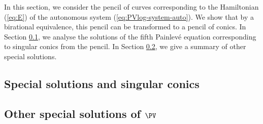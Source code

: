 In this section, we consider the pencil of curves corresponding to the Hamiltonian (\ref{eq:E}) of the autonomous system (\ref{eq:PVlog-system-auto}).
We show that by a birational equivalence, this pencil can be transformed to a pencil of conics.
In Section \ref{sec:conics}, we analyse the solutions of the fifth Painlev\'e equation corresponding to singular conics from the pencil.
In Section \ref{sec:other}, we give a summary of other special solutions.

\subsection{Special solutions and singular conics}
\label{sec:conics}


\subsection{Other special solutions of $\PV$}
\label{sec:other}
